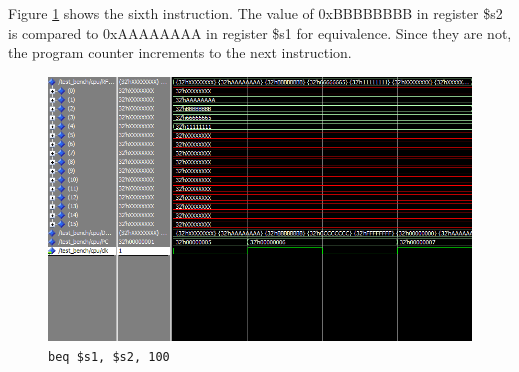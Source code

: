 \documentclass[12pt]{article}
\begin{document}
Figure \ref{fig:6-instr} shows the sixth instruction. The value of 0xBBBBBBBB in register \$s2 is compared to 0xAAAAAAAA in register \$s1 for equivalence. Since they are not, the program counter increments to the next instruction.
\begin{figure}[h!]
\centering
\includegraphics[width=\linewidth]{simulation/6-instr}
\caption{\texttt{beq \$s1, \$s2, 100}}
\label{fig:6-instr}
\end{figure}
\clearpage
\end{document}
